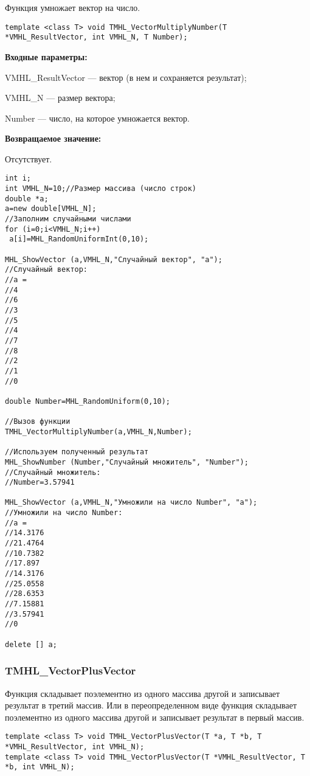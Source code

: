 \documentclass[a4paper,12pt]{article}
\begin{document}
Функция умножает вектор на число.


\begin{lstlisting}[label=code_syntax_TMHL_VectorMultiplyNumber,caption=Синтаксис]
template <class T> void TMHL_VectorMultiplyNumber(T *VMHL_ResultVector, int VMHL_N, T Number);
\end{lstlisting}

\textbf{Входные параметры:}

 VMHL\_ResultVector --- вектор (в нем и сохраняется результат);
 
 VMHL\_N --- размер вектора;
 
 Number --- число, на которое умножается вектор.

\textbf{Возвращаемое значение:}

Отсутствует.


\begin{lstlisting}[label=code_use_TMHL_VectorMultiplyNumber,caption=Пример использования]
int i;
int VMHL_N=10;//Размер массива (число строк)
double *a;
a=new double[VMHL_N];
//Заполним случайными числами
for (i=0;i<VMHL_N;i++)
 a[i]=MHL_RandomUniformInt(0,10);

MHL_ShowVector (a,VMHL_N,"Случайный вектор", "a");
//Случайный вектор:
//a =
//4
//6
//3
//5
//4
//7
//8
//2
//1
//0

double Number=MHL_RandomUniform(0,10);

//Вызов функции
TMHL_VectorMultiplyNumber(a,VMHL_N,Number);

//Используем полученный результат
MHL_ShowNumber (Number,"Случайный множитель", "Number");
//Случайный множитель:
//Number=3.57941

MHL_ShowVector (a,VMHL_N,"Умножили на число Number", "a");
//Умножили на число Number:
//a =
//14.3176
//21.4764
//10.7382
//17.897
//14.3176
//25.0558
//28.6353
//7.15881
//3.57941
//0

delete [] a;
\end{lstlisting}

\subsubsection{TMHL\_VectorPlusVector}\label{TMHL_VectorPlusVector}

Функция складывает поэлементно из одного массива другой и записывает результат в третий массив. Или в переопределенном виде функция складывает поэлементно из одного массива другой и записывает результат в первый массив.


\begin{lstlisting}[label=code_syntax_TMHL_VectorPlusVector,caption=Синтаксис]
template <class T> void TMHL_VectorPlusVector(T *a, T *b, T *VMHL_ResultVector, int VMHL_N);
template <class T> void TMHL_VectorPlusVector(T *VMHL_ResultVector, T *b, int VMHL_N);
\end{lstlisting}
\end{document}
